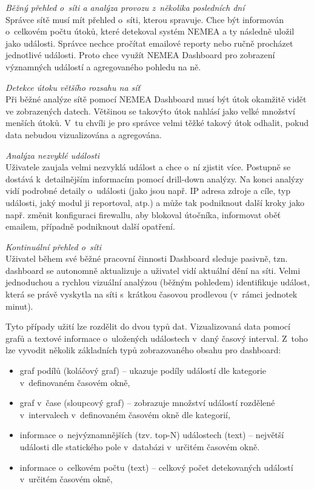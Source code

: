 \begin{description}
    \item \textit{Běžný přehled o~síti a analýza provozu z~několika posledních dní} \\
        Správce sítě musí mít přehled o~síti, kterou spravuje. Chce být informován o~celkovém počtu útoků, které detekoval systém NEMEA a ty následně uložil jako události. Správce nechce pročítat emailové reporty nebo ručně procházet jednotlivé události. Proto chce využít NEMEA Dashboard pro zobrazení významných událostí a agregovaného pohledu na ně.
    \item \textit{Detekce útoku většího rozsahu na síť} \\
        Při běžné analýze sítě pomocí NEMEA Dashboard musí být útok okamžitě vidět ve zobrazených datech. Většinou se takovýto útok nahlásí jako velké množství menších útoků. V~tu chvíli je pro správce velmi těžké takový útok odhalit, pokud data nebudou vizualizována a agregována.
    \item \textit{Analýza nezvyklé události} \\
        Uživatele zaujala velmi nezvyklá událost a chce o~ní zjistit více. Postupně se dostává k~detailnějším informacím pomocí drill-down analýzy. Na konci analýzy vidí podrobné detaily o~události (jako jsou např. IP adresa zdroje a cíle, typ události, jaký modul ji reportoval, atp.) a může tak podniknout další kroky jako např. změnit konfiguraci firewallu, aby blokoval útočníka, informovat oběť emailem, případně podniknout další opatření.
    \item \textit{Kontinuální přehled o~síti} \\
        Uživatel během své běžné pracovní činnosti Dashboard sleduje pasivně, tzn. dashboard se autonomně aktualizuje a uživatel vidí aktuální dění na síti. Velmi jednoduchou a rychlou vizuální analýzou (běžným pohledem) identifikuje událost, která se právě vyskytla na síti s~krátkou časovou prodlevou (v~rámci jednotek minut).
        
\end{description}

Tyto případy užití lze rozdělit do dvou typů dat. Vizualizovaná data pomocí grafů a textové informace o~uložených událostech v~daný časový interval. Z~toho lze vyvodit několik základních typů zobrazovaného obsahu pro dashboard:

\begin{itemize}
    \item graf podílů (koláčový graf) -- ukazuje podíly událostí dle kategorie v~definovaném časovém okně,
    \item graf v~čase (sloupcový graf) -- zobrazuje množství událostí rozdělené v~intervalech v~definovaném časovém okně dle kategorií,
    \item informace o~nejvýznamnějších (tzv. top-N) událostech (text) -- největší události dle statického pole v~databázi v~určitém časovém okně.
    \item informace o~celkovém počtu (text) -- celkový počet detekovaných událostí v~určitém časovém okně,
\end{itemize}


